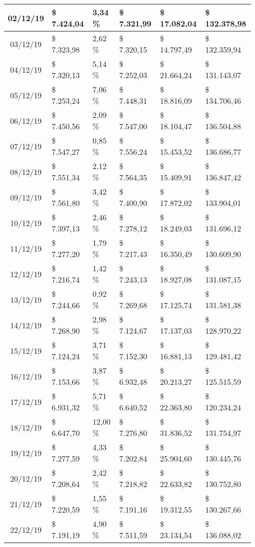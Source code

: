 \begin{small}
\begin{longtable}{|c|l|l|l|l|l|}
02/12/19 & \$ 7.424,04 & 3,34 \% & \$ 7.321,99 & \$ 17.082,04 & \$ 132.378,98 \\ \hline
03/12/19 & \$ 7.323,98 & 2,62 \% & \$ 7.320,15 & \$ 14.797,49 & \$ 132.359,94 \\ \hline
04/12/19 & \$ 7.320,13 & 5,14 \% & \$ 7.252,03 & \$ 21.664,24 & \$ 131.143,07 \\ \hline
05/12/19 & \$ 7.253,24 & 7,06 \% & \$ 7.448,31 & \$ 18.816,09 & \$ 134.706,46 \\ \hline
06/12/19 & \$ 7.450,56 & 2,09 \% & \$ 7.547,00 & \$ 18.104,47 & \$ 136.504,88 \\ \hline
07/12/19 & \$ 7.547,27 & 0,85 \% & \$ 7.556,24 & \$ 15.453,52 & \$ 136.686,77 \\ \hline
08/12/19 & \$ 7.551,34 & 2,12 \% & \$ 7.564,35 & \$ 15.409,91 & \$ 136.847,42 \\ \hline
09/12/19 & \$ 7.561,80 & 3,42 \% & \$ 7.400,90 & \$ 17.872,02 & \$ 133.904,01 \\ \hline
10/12/19 & \$ 7.397,13 & 2,46 \% & \$ 7.278,12 & \$ 18.249,03 & \$ 131.696,12 \\ \hline
11/12/19 & \$ 7.277,20 & 1,79 \% & \$ 7.217,43 & \$ 16.350,49 & \$ 130.609,90 \\ \hline
12/12/19 & \$ 7.216,74 & 1,42 \% & \$ 7.243,13 & \$ 18.927,08 & \$ 131.087,15 \\ \hline
13/12/19 & \$ 7.244,66 & 0,92 \% & \$ 7.269,68 & \$ 17.125,74 & \$ 131.581,38 \\ \hline
14/12/19 & \$ 7.268,90 & 2,98 \% & \$ 7.124,67 & \$ 17.137,03 & \$ 128.970,22 \\ \hline
15/12/19 & \$ 7.124,24 & 3,71 \% & \$ 7.152,30 & \$ 16.881,13 & \$ 129.481,42 \\ \hline
16/12/19 & \$ 7.153,66 & 3,87 \% & \$ 6.932,48 & \$ 20.213,27 & \$ 125.515,59 \\ \hline
17/12/19 & \$ 6.931,32 & 5,71 \% & \$ 6.640,52 & \$ 22.363,80 & \$ 120.234,24 \\ \hline
18/12/19 & \$ 6.647,70 & 12,00 \% & \$ 7.276,80 & \$ 31.836,52 & \$ 131.754,97 \\ \hline
19/12/19 & \$ 7.277,59 & 4,33 \% & \$ 7.202,84 & \$ 25.904,60 & \$ 130.445,76 \\ \hline
20/12/19 & \$ 7.208,64 & 2,42 \% & \$ 7.218,82 & \$ 22.633,82 & \$ 130.752,80 \\ \hline
21/12/19 & \$ 7.220,59 & 1,55 \% & \$ 7.191,16 & \$ 19.312,55 & \$ 130.267,66 \\ \hline
22/12/19 & \$ 7.191,19 & 4,90 \% & \$ 7.511,59 & \$ 23.134,54 & \$ 136.088,02 \\ \hline

\end{longtable}
\end{small}
